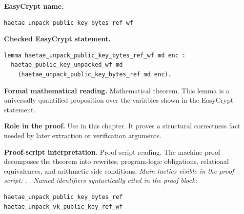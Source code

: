 \begin{formaltheorem}
\noindent\textbf{EasyCrypt name.}
\begin{lstlisting}[language=EasyCrypt,basicstyle=\ttfamily\scriptsize]
haetae_unpack_public_key_bytes_ref_wf
\end{lstlisting}
\noindent\textbf{Checked EasyCrypt statement.}
\begin{lstlisting}[language=EasyCrypt,basicstyle=\ttfamily\scriptsize]
lemma haetae_unpack_public_key_bytes_ref_wf md enc :
  haetae_public_key_unpacked_wf md
    (haetae_unpack_public_key_bytes_ref md enc).
\end{lstlisting}
\noindent\textbf{Formal mathematical reading.}
Mathematical theorem. This lemma is a universally quantified proposition over the variables shown in the EasyCrypt statement.

\noindent\textbf{Role in the proof.}
Use in this chapter. It proves a structural correctness fact needed by later extraction or verification arguments.

\noindent\textbf{Proof-script interpretation.}
Proof-script reading. The machine proof decomposes the theorem into rewrites, program-logic obligations, relational equivalences, and arithmetic side conditions.
\emph{Main tactics visible in the proof script:} , .
\emph{Named identifiers syntactically cited in the proof block:}
\begin{lstlisting}[language=EasyCrypt,basicstyle=\ttfamily\scriptsize]
haetae_unpack_public_key_bytes_ref
haetae_unpack_vk_public_key_ref_wf
\end{lstlisting}

\end{formaltheorem}

